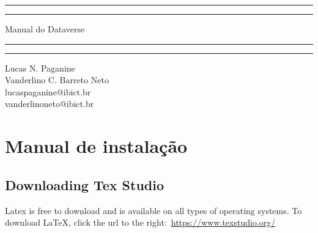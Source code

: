 \documentclass[12pt,hidelinks]{article}
\begin{document}
\begin{titlepage}
	\centering %
	\scshape %
	\vspace*{1.5\baselineskip} %

	\rule{13cm}{1.6pt}\vspace*{-\baselineskip}\vspace*{2pt} %
	\rule{13cm}{0.4pt} %
	
		\vspace{0.75\baselineskip} %
	{	\Huge Manual do Dataverse\\ 
			\vspace{4mm}}
		\vspace{0.75\baselineskip} %
	\rule{13cm}{0.4pt}\vspace*{-\baselineskip}\vspace{3.2pt} %
	\rule{13cm}{1.6pt} %
	
		\vspace{1.75\baselineskip} %
	{\large Lucas N. Paganine\\ Vanderlino C. Barreto Neto \\
		\vspace*{1.2\baselineskip}
	lucaspaganine@ibict.br\\ vanderlinoneto@ibict.br} \\
	\vfill
\end{titlepage}
\tableofcontents
\vfill
\newpage
{}
\section{Manual de instalação}
\vspace{10.5cm}

	\subsection{Downloading Tex Studio}
			Latex is free to download and is available on all types of operating systems. To download \LaTeX, click the url to the right:\, \url{https://www.texstudio.org/}
\end{document}
